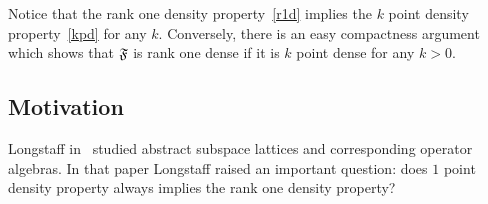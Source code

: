 \documentclass[12pt]{amsart}
\theoremstyle{case}
\begin{document}
    Notice that the rank one density property~\eqref{r1d} implies the $k$ point density property~\eqref{kpd} for any $k$.
    Conversely, there is an easy compactness argument which shows that $\mathfrak{F}$ is rank one dense if it is
      $k$ point dense for any $k > 0$.

  \subsection{Motivation}



  Long\-staff in~\cite{longstaff} studied abstract subspace lattices and corresponding operator algebras.
  In that paper Longstaff raised an important question: does $1$ point density property always implies the rank one density property?
\end{document}
